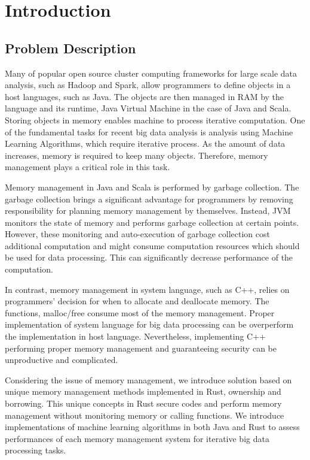 \chapter{Introduction}
\label{chapter:Introduction}
\thispagestyle{myheadings}

\section{Problem Description}
\label{sec:history}

Many of popular open source cluster computing frameworks for large scale data analysis, 
such as Hadoop and Spark, allow programmers to define objects in a host languages, such as Java.
The objects are then managed in RAM by the language and its runtime, Java Virtual Machine 
in the case of Java and Scala. Storing objects in memory enables machine to process iterative computation. 
One of the fundamental tasks for recent big data analysis is analysis using Machine Learning Algorithms, 
which require iterative process. As the amount of data increases, memory is required to keep many objects. 
Therefore, memory management plays a critical role in this task. 

Memory management in Java and Scala is performed by garbage collection. 
The garbage collection brings a significant advantage for programmers by removing responsibility
for planning memory management by themselves. Instead, JVM monitors the state of memory and performs garbage
collection at certain points. However, these monitoring and auto-execution of garbage collection cost additional 
computation and might consume computation resources which should be used for data processing. This can significantly decrease performance of the computation. 

In contrast, memory management in system language, such as C++, relies on programmers’ decision for when to allocate and deallocate memory. 
The functions, malloc/free consume most of the memory management. Proper implementation of system language for big data processing can be overperform the implementation in host language.
Nevertheless, implementing C++ performing proper memory management and guaranteeing security can be unproductive and complicated. 

Considering the issue of memory management, we introduce solution based on unique memory management methods implemented in Rust, ownership and borrowing.
This unique concepts in Rust secure codes and perform memory management without monitoring memory or calling functions. We introduce implementations of
machine learning algorithms in both Java and Rust to assess performances of each memory management system for iterative big data processing tasks.



